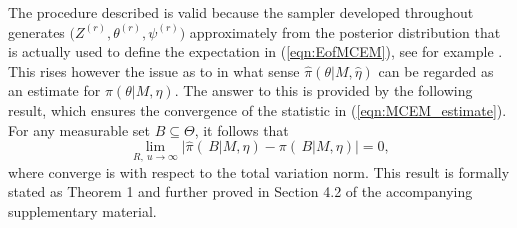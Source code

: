 \documentclass{bioinfo}
\begin{document}
The procedure described is valid because the sampler developed
throughout generates $\big(Z^{(r)}, \theta^{(r)}, \psi^{(r)}\big)$
approximately from the posterior distribution that is actually used to
define the expectation in (\ref{eqn:EofMCEM}), see for example
\cite{FM}. This rises however the issue as to in what sense
$\widehat\pi(\theta|M, \hat\eta)$ can be regarded as an estimate for
$\pi(\theta|M, \eta)$. The answer to this is provided by the following
result, which ensures the convergence of the statistic in
(\ref{eqn:MCEM_estimate}). For any measurable set $B\subseteq
\Theta$, it follows that 
\[
    \lim_{R,\ u\to\infty}
     \big|
       \widehat\pi(\, B|M, \hat\eta) - \pi(\, B|M,\eta)
     \big|
   =
    0,
\]
 where converge is with respect to the total variation norm. This
 result is formally stated as Theorem 1 and further proved in Section 
 4.2 of the accompanying supplementary material.




\end{document}
